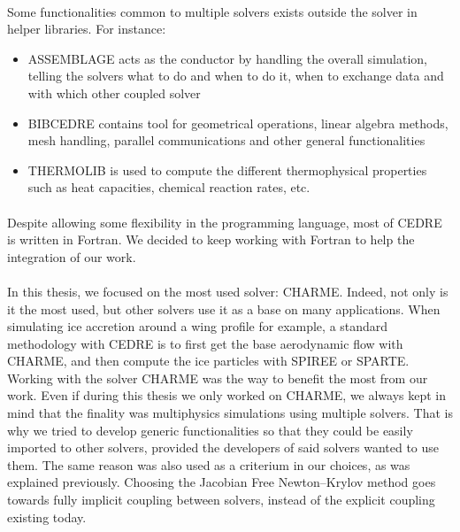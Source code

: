     \paragraph{}
    Some functionalities common to multiple solvers exists outside the solver in helper libraries.
    For instance:
    \begin{itemize}
      \item ASSEMBLAGE acts as the conductor by handling the overall simulation, telling the solvers what to do and when to do it, when to exchange data and with which other coupled solver
      \item BIBCEDRE contains tool for geometrical operations, linear algebra methods, mesh handling, parallel communications and other general functionalities
      \item THERMOLIB is used to compute the different thermophysical properties such as heat capacities, chemical reaction rates, etc. 
    \end{itemize}

    \paragraph{}
    Despite allowing some flexibility in the programming language, most of CEDRE is written in Fortran.
    We decided to keep working with Fortran to help the integration of our work.

    \paragraph{}
    In this thesis, we focused on the most used solver: CHARME.
    Indeed, not only is it the most used, but other solvers use it as a base on many applications.
    When simulating ice accretion around a wing profile for example, a standard methodology with CEDRE is to first get the base aerodynamic flow with CHARME, and then compute the ice particles with SPIREE or SPARTE.
    Working with the solver CHARME was the way to benefit the most from our work.
    Even if during this thesis we only worked on CHARME, we always kept in mind that the finality was multiphysics simulations using multiple solvers.
    That is why we tried to develop generic functionalities so that they could be easily imported to other solvers, provided the developers of said solvers wanted to use them.
    The same reason was also used as a criterium in our choices, as was explained previously.
    Choosing the Jacobian Free Newton--Krylov method goes towards fully implicit coupling between solvers, instead of the explicit coupling existing today.

